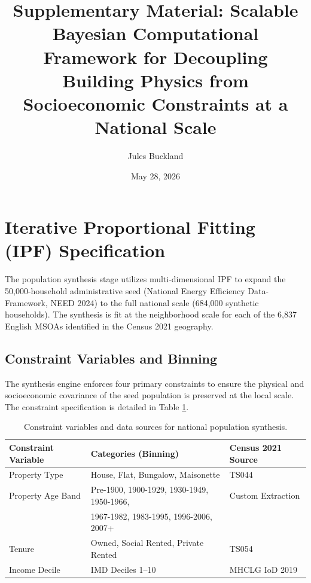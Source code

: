 \documentclass[11pt, a4paper]{article}
\title{Supplementary Material: Scalable Bayesian Computational Framework for Decoupling Building Physics from Socioeconomic Constraints at a National Scale}
\author{Jules Buckland}
\date{May 28, 2026}
\begin{document}
\maketitle

\setcounter{section}{0}
\renewcommand{\thesection}{S\arabic{section}}
\renewcommand{\thetable}{S\arabic{table}}
\renewcommand{\thefigure}{S\arabic{figure}}

\tableofcontents
\newpage

\section{Iterative Proportional Fitting (IPF) Specification}

The population synthesis stage utilizes multi-dimensional IPF to expand 
the 50,000-household administrative seed (National Energy Efficiency 
Data-Framework, NEED 2024) to the full national scale (684,000 synthetic 
households). The synthesis is fit at the neighborhood scale for each of the 
6,837 English MSOAs identified in the Census 2021 geography.

\subsection{Constraint Variables and Binning}

The synthesis engine enforces four primary constraints to ensure the 
physical and socioeconomic covariance of the seed population is preserved 
at the local scale. The constraint specification is detailed in 
Table \ref{tab:ipf_spec}.

\begin{table}[H]
\centering
\begin{tabular}{lll}
\toprule
Constraint Variable & Categories (Binning) & Census 2021 Source \\
\midrule
Property Type & House, Flat, Bungalow, Maisonette & TS044 \\
Property Age Band & Pre-1900, 1900-1929, 1930-1949, 1950-1966, & Custom Extraction \\
& 1967-1982, 1983-1995, 1996-2006, 2007+ & \\
Tenure & Owned, Social Rented, Private Rented & TS054 \\
Income Decile & IMD Deciles 1--10 & MHCLG IoD 2019 \\
\bottomrule
\end{tabular}
\caption{Constraint variables and data sources for national population synthesis.}
\label{tab:ipf_spec}
\end{table}
\end{document}
